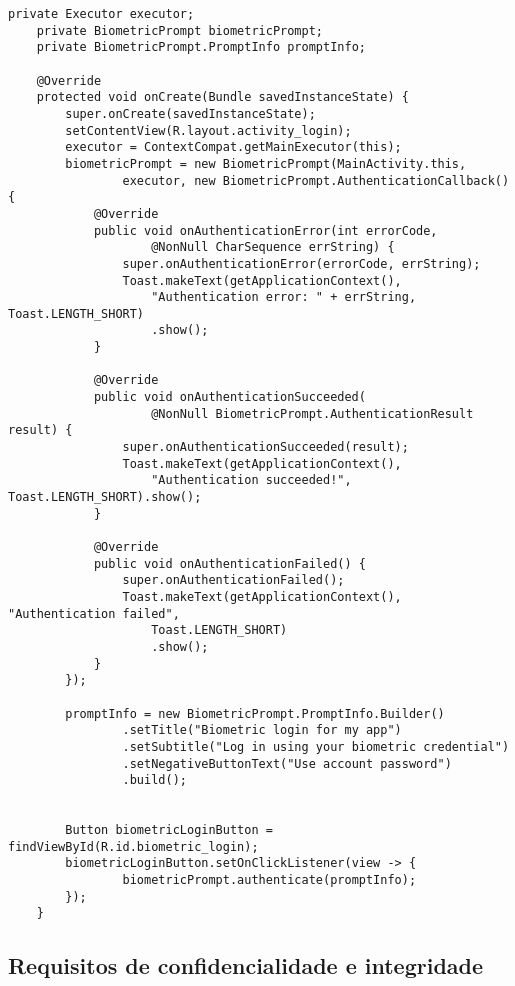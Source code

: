     \begin{scriptsize}
    \estiloJava
    \begin{lstlisting}[caption={Autenticação por digital}, label=lst:javacode]
    private Executor executor;
    private BiometricPrompt biometricPrompt;
    private BiometricPrompt.PromptInfo promptInfo;
    
    @Override
    protected void onCreate(Bundle savedInstanceState) {
        super.onCreate(savedInstanceState);
        setContentView(R.layout.activity_login);
        executor = ContextCompat.getMainExecutor(this);
        biometricPrompt = new BiometricPrompt(MainActivity.this,
                executor, new BiometricPrompt.AuthenticationCallback() {
            @Override
            public void onAuthenticationError(int errorCode,
                    @NonNull CharSequence errString) {
                super.onAuthenticationError(errorCode, errString);
                Toast.makeText(getApplicationContext(),
                    "Authentication error: " + errString, Toast.LENGTH_SHORT)
                    .show();
            }
    
            @Override
            public void onAuthenticationSucceeded(
                    @NonNull BiometricPrompt.AuthenticationResult result) {
                super.onAuthenticationSucceeded(result);
                Toast.makeText(getApplicationContext(),
                    "Authentication succeeded!", Toast.LENGTH_SHORT).show();
            }
    
            @Override
            public void onAuthenticationFailed() {
                super.onAuthenticationFailed();
                Toast.makeText(getApplicationContext(), "Authentication failed",
                    Toast.LENGTH_SHORT)
                    .show();
            }
        });
    
        promptInfo = new BiometricPrompt.PromptInfo.Builder()
                .setTitle("Biometric login for my app")
                .setSubtitle("Log in using your biometric credential")
                .setNegativeButtonText("Use account password")
                .build();
    

        Button biometricLoginButton = findViewById(R.id.biometric_login);
        biometricLoginButton.setOnClickListener(view -> {
                biometricPrompt.authenticate(promptInfo);
        });
    }
    \end{lstlisting}
    \end{scriptsize}
    

    \subsection{Requisitos de confidencialidade e integridade}

